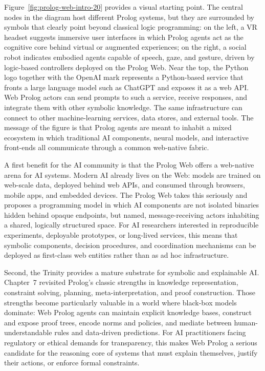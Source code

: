 Figure~\ref{fig:prolog-web-intro-20} provides a visual starting point. The central nodes in the diagram host different Prolog systems, but they are surrounded by symbols that clearly point beyond classical logic programming: on the left, a VR headset suggests immersive user interfaces in which Prolog agents act as the cognitive core behind virtual or augmented experiences; on the right, a social robot indicates embodied agents capable of speech, gaze, and gesture, driven by logic-based controllers deployed on the Prolog Web. Near the top, the Python logo together with the OpenAI mark represents a Python-based service that fronts a large language model such as ChatGPT and exposes it as a web API. Web Prolog actors can send prompts to such a service, receive responses, and integrate them with other symbolic knowledge. The same infrastructure can connect to other machine-learning services, data stores, and external tools. The message of the figure is that Prolog agents are meant to inhabit a mixed ecosystem in which traditional AI components, neural models, and interactive front-ends all communicate through a common web-native fabric.

A first benefit for the AI community is that the Prolog Web offers a web-native arena for AI systems. Modern AI already lives on the Web: models are trained on web-scale data, deployed behind web APIs, and consumed through browsers, mobile apps, and embedded devices. The Prolog Web takes this seriously and proposes a programming model in which AI components are not isolated binaries hidden behind opaque endpoints, but named, message-receiving actors inhabiting a shared, logically structured space. For AI researchers interested in reproducible experiments, deployable prototypes, or long-lived services, this means that symbolic components, decision procedures, and coordination mechanisms can be deployed as first-class web entities rather than as ad hoc infrastructure.

Second, the Trinity provides a mature substrate for symbolic and explainable AI. Chapter~7 revisited Prolog's classic strengths in knowledge representation, constraint solving, planning, meta-interpretation, and proof construction. Those strengths become particularly valuable in a world where black-box models dominate: Web Prolog agents can maintain explicit knowledge bases, construct and expose proof trees, encode norms and policies, and mediate between human-understandable rules and data-driven predictions. For AI practitioners facing regulatory or ethical demands for transparency, this makes Web Prolog a serious candidate for the reasoning core of systems that must explain themselves, justify their actions, or enforce formal constraints.

